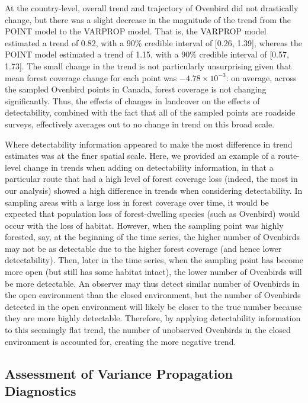 \documentclass[12pt]{article}
\begin{document}
\par At the country-level, overall trend and trajectory of Ovenbird did not drastically change, but there was a slight decrease in the magnitude of the trend from the POINT model to the VARPROP model.
That is, the VARPROP model estimated a trend of 0.82, with a 90\% credible interval of [0.26, 1.39], whereas the POINT model estimated a trend of 1.15, with a 90\% credible interval of [0.57, 1.73].
The small change in the trend is not particularly unsurprising given that mean forest coverage change for each point was $-4.78 \times 10^{-3}$: on average, across the sampled Ovenbird points in Canada, forest coverage is not changing significantly.
Thus, the effects of changes in landcover on the effects of detectability, combined with the fact that all of the sampled points are roadside surveys, effectively averages out to no change in trend on this broad scale.

\par Where detectability information appeared to make the most difference in trend estimates was at the finer spatial scale.
Here, we provided an example of a route-level change in trends when adding on detectability information, in that a particular route that had a high level of forest coverage loss (indeed, the most in our analysis) showed a high difference in trends when considering detectability.
In sampling areas with a large loss in forest coverage over time, it would be expected that population loss of forest-dwelling species (such as Ovenbird) would occur with the loss of habitat.
However, when the sampling point was highly forested, say, at the beginning of the time series, the higher number of Ovenbirds may not be as detectable due to the higher forest coverage (and hence lower detectability).
Then, later in the time series, when the sampling point has become more open (but still has some habitat intact), the lower number of Ovenbirds will be more detectable.
An observer may thus detect similar number of Ovenbirds in the open environment than the closed environment, but the number of Ovenbirds detected in the open environment will likely be closer to the true number because they are more highly detectable.
Therefore, by applying detectability information to this seemingly flat trend, the number of unobserved Ovenbirds in the closed environment is accounted for, creating the more negative trend.

\subsection{Assessment of Variance Propagation Diagnostics}
\end{document}
